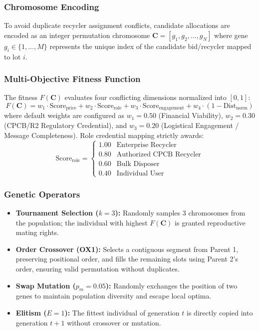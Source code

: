 \documentclass[12pt,a4paper]{article}
\begin{document}
\subsubsection{Chromosome Encoding}
To avoid duplicate recycler assignment conflicts, candidate allocations are encoded as an integer permutation chromosome $\mathbf{C} = [g_1, g_2, \dots, g_N]$ where gene $g_i \in \{1, \dots, M\}$ represents the unique index of the candidate bid/recycler mapped to lot $i$.

\subsubsection{Multi-Objective Fitness Function}
The fitness $F(\mathbf{C})$ evaluates four conflicting dimensions normalized into $[0, 1]$:
\begin{equation}
    F(\mathbf{C}) = w_1 \cdot \text{Score}_{\text{price}} + w_2 \cdot \text{Score}_{\text{role}} + w_3 \cdot \text{Score}_{\text{engagement}} + w_4 \cdot (1 - \text{Dist}_{\text{norm}})
\end{equation}
where default weights are configured as $w_1 = 0.50$ (Financial Viability), $w_2 = 0.30$ (CPCB/R2 Regulatory Credential), and $w_3 = 0.20$ (Logistical Engagement / Message Completeness). Role credential mapping strictly awards:
\begin{equation}
    \text{Score}_{\text{role}} = 
    \begin{cases}
        1.00 & \text{Enterprise Recycler} \\
        0.80 & \text{Authorized CPCB Recycler} \\
        0.60 & \text{Bulk Disposer} \\
        0.40 & \text{Individual User}
    \end{cases}
\end{equation}

\subsubsection{Genetic Operators}
\begin{itemize}
    \item \textbf{Tournament Selection ($k=3$):} Randomly samples 3 chromosomes from the population; the individual with highest $F(\mathbf{C})$ is granted reproductive mating rights.
    \item \textbf{Order Crossover (OX1):} Selects a contiguous segment from Parent 1, preserving positional order, and fills the remaining slots using Parent 2's order, ensuring valid permutation without duplicates.
    \item \textbf{Swap Mutation ($p_m = 0.05$):} Randomly exchanges the position of two genes to maintain population diversity and escape local optima.
    \item \textbf{Elitism ($E = 1$):} The fittest individual of generation $t$ is directly copied into generation $t+1$ without crossover or mutation.
\end{itemize}
\end{document}
